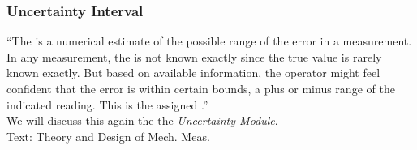 \documentclass[fleqn]{beamer} %
\newcommand{\sectiontitleIV}{Uncertainty Interval}
\begin{document}
\begin{frame}[label=sectionIV]
\frametitle{\sectiontitleIV}

``The \hspcu is a numerical estimate of the possible range of the error in a measurement. In any
measurement, the \hspcu is not known exactly since the true value is rarely known exactly. But based on
available information, the operator might feel confident that the error is within certain bounds, a plus
or minus range of the indicated reading. This is the assigned \hspcu.''\vspace{5mm}\\
We will discuss this again the the {\it Uncertainty Module}.\vspace{10mm}\\

{\tiny Text: Theory and Design of Mech. Meas.}
\end{frame}
\end{document}
